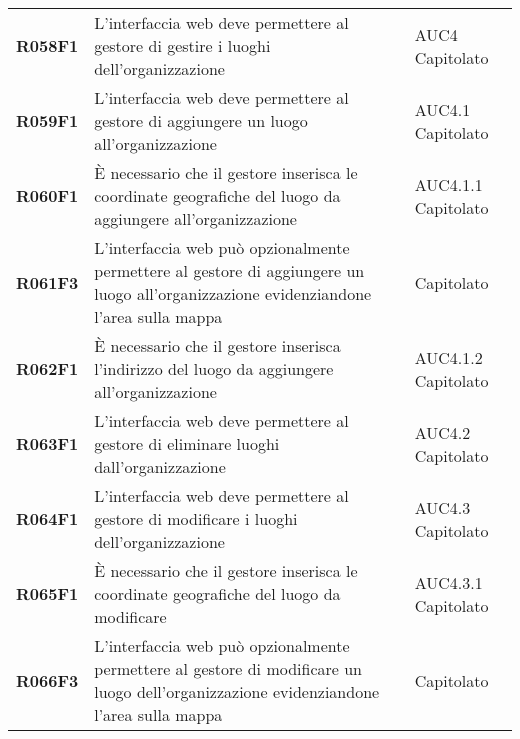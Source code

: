 \documentclass[../analisi-dei-requisiti.tex]{subfiles}
\begin{document}
\begin{longtable}[H]{>{\centering\bfseries}m{3cm} >{\centering}m{10cm} >{\centering\arraybackslash}m{3cm}}
  R058F1                               & L'interfaccia web deve permettere al gestore di gestire i luoghi dell'organizzazione                                                                                                                    & AUC4 Capitolato               \\
  R059F1                               & L'interfaccia web deve permettere al gestore di aggiungere un luogo all'organizzazione                                                                                                                  & AUC4.1 Capitolato             \\
  R060F1                               & È necessario che il gestore inserisca le coordinate geografiche del luogo da aggiungere all'organizzazione                                                                                              & AUC4.1.1 Capitolato           \\
  R061F3                               & L'interfaccia web può opzionalmente permettere al gestore di aggiungere un luogo all'organizzazione evidenziandone l'area sulla mappa                                                                   & Capitolato                    \\
  R062F1                               & È necessario che il gestore inserisca l'indirizzo del luogo da aggiungere all'organizzazione                                                                                                            & AUC4.1.2 Capitolato           \\
  R063F1                               & L'interfaccia web deve permettere al gestore di eliminare luoghi dall'organizzazione                                                                                                                    & AUC4.2 Capitolato             \\
  R064F1                               & L'interfaccia web deve permettere al gestore di modificare i luoghi dell'organizzazione                                                                                                                 & AUC4.3 Capitolato             \\
  R065F1                               & È necessario che il gestore inserisca le coordinate geografiche del luogo da modificare                                                                                                                 & AUC4.3.1 Capitolato           \\
  R066F3                               & L'interfaccia web può opzionalmente permettere al gestore di modificare un luogo dell'organizzazione evidenziandone l'area sulla mappa                                                                  & Capitolato                    \\

\end{longtable}
\end{document}
